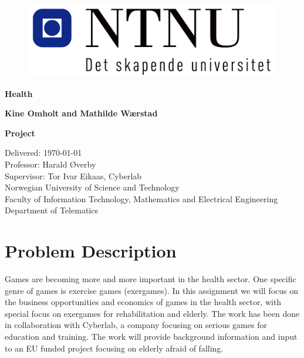 \documentclass[b5paper,twoside,openright,11pt]{report}
\begin{document}
\begin{flushleft}
\begin{figure}[htb]
\includegraphics[scale=0.6]{NTNU-logo}
\end{figure}
\bigskip
\bigskip
\bigskip
\bigskip
\begin{huge}
\textbf{Health}\\
\end{huge} 
\bigskip
\bigskip
\bigskip
\bigskip
\bigskip
\bigskip
\bigskip
\bigskip
\bigskip
\begin{Large}
\textbf{Kine Omholt and Mathilde Wærstad}
\end{Large}
\bigskip
\bigskip
\bigskip
\bigskip
\bigskip
\bigskip
\bigskip
\bigskip
\bigskip
\bigskip
\bigskip
\bigskip
\bigskip
\bigskip
\begin{large}
\textbf{Project\\}
\end{large}
Delivered: \today\\
Professor: Harald Øverby\\
Supervisor: Tor Ivar Eikaas, Cyberlab\\
\bigskip
\bigskip
\bigskip
\bigskip
\bigskip
Norwegian University of Science and Technology\\ 
Faculty of Information Technology, Mathematics and Electrical Engineering\\
Department of Telematics
\end{flushleft}
\chapter*{Problem Description} 
Games are becoming more and more important in the health sector. One specific genre of games is exercise games (exergames). In this assignment we will focus on the business opportunities and economics of games in the health sector, with special focus on exergames for rehabilitation and elderly. The work has been done in collaboration with Cyberlab, a company focusing on serious games for education and training. The work will provide background information and input to an EU funded project focusing on elderly afraid of falling.
\end{document}
